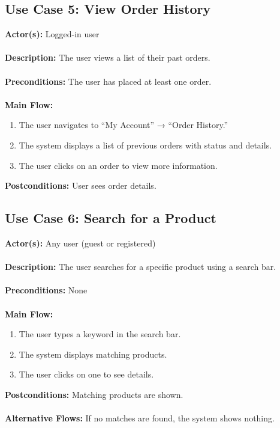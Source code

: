 \documentclass[a4paper,12pt]{article}
\begin{document}
	\subsection*{Use Case 5: View Order History}
	\textbf{Actor(s):} Logged-in user \\ \\
	\textbf{Description:} The user views a list of their past orders. \\ \\
	\textbf{Preconditions:} The user has placed at least one order. \\ \\
	\textbf{Main Flow:}
	\begin{enumerate}
  		\item The user navigates to ``My Account'' → ``Order History.''
  		\item The system displays a list of previous orders with status and details.
  		\item The user clicks on an order to view more information.
	\end{enumerate}
	\textbf{Postconditions:} User sees order details.
	\subsection*{Use Case 6: Search for a Product}
	\textbf{Actor(s):} Any user (guest or registered) \\ \\
	\textbf{Description:} The user searches for a specific product using a search bar. \\ \\
	\textbf{Preconditions:} None \\ \\
	\textbf{Main Flow:}
	\begin{enumerate}
  		\item The user types a keyword in the search bar.
  		\item The system displays matching products.
  		\item The user clicks on one to see details.
	\end{enumerate}
	\textbf{Postconditions:} Matching products are shown. \\ \\
	\textbf{Alternative Flows:} If no matches are found, the system shows nothing.
\end{document}
